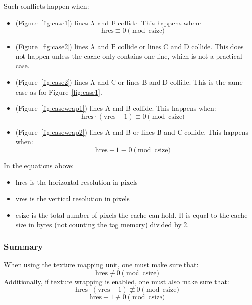 \documentclass[a4paper,11pt]{article}
\begin{document}
Such conflicts happen when:
\begin{itemize}
\item (Figure~\ref{fig:case1}) lines A and B collide. This happens when:
\begin{equation*}
\text{hres} \equiv 0 \pmod{\text{csize}}
\end{equation*}
\item (Figure~\ref{fig:case2}) lines A and B collide or lines C and D collide. This does not happen unless the cache only contains one line, which is not a practical case.
\item (Figure~\ref{fig:case2}) lines A and C or lines B and D collide. This is the same case as for Figure~\ref{fig:case1}.
\item (Figure~\ref{fig:casewrap1}) lines A and B collide. This happens when:
\begin{equation*}
\text{hres}\cdot(\text{vres}-1) \equiv 0 \pmod{\text{csize}}
\end{equation*}
\item (Figure~\ref{fig:casewrap2}) lines A and B or lines B and C collide. This happens when:
\begin{equation*}
\text{hres}-1 \equiv 0 \pmod{\text{csize}}
\end{equation*}
\end{itemize}

In the equations above:
\begin{itemize}
\item hres is the horizontal resolution in pixels
\item vres is the vertical resolution in pixels
\item csize is the total number of pixels the cache can hold. It is equal to the cache size in bytes (not counting the tag memory) divided by 2.
\end{itemize}

\subsubsection{Summary}
When using the texture mapping unit, one must make sure that:
\begin{equation*}
\text{hres} \not \equiv 0 \pmod{\text{csize}}
\end{equation*}
Additionally, if texture wrapping is enabled, one must also make sure that:
\begin{equation*}
\text{hres}\cdot(\text{vres}-1) \not \equiv 0 \pmod{\text{csize}}
\end{equation*}
\begin{equation*}
\text{hres}-1 \not \equiv 0 \pmod{\text{csize}}
\end{equation*}
\end{document}
